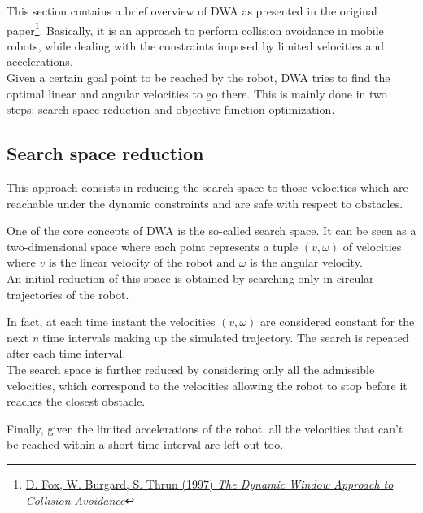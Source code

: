 \documentclass[11pt,a4paper]{article}
\begin{document}
This section contains a brief overview of DWA as presented in the original
paper\footnote{\href{https://www.ri.cmu.edu/pub_files/pub1/fox_dieter_1997_1/fox_dieter_1997_1.pdf}
{D. Fox, W. Burgard, S. Thrun (1997) \textit{The Dynamic Window Approach to Collision Avoidance}}}.
Basically, it is an approach to perform collision avoidance in mobile robots, while dealing with the constraints
imposed by limited velocities and accelerations.\\

Given a certain goal point to be reached by the robot, DWA tries to find the optimal linear and angular velocities
to go there. This is mainly done in two steps: search space reduction and objective function optimization.



\subsection{Search space reduction}

This approach consists in reducing the search space to those velocities which are reachable under the dynamic
constraints and are safe with respect to obstacles.

One of the core concepts of DWA is the so-called search space. It can be seen as a two-dimensional space where
each point represents a tuple $(v, \omega)$ of velocities where $v$ is the linear velocity of the robot and
$\omega$ is the angular velocity.\\

An initial reduction of this space is obtained by searching only in circular trajectories of the robot.

In fact, at each time instant the velocities $(v, \omega)$ are considered constant for the next \textit{n}
time intervals making up the simulated trajectory. The search is repeated after each time interval.\\

The search space is further reduced by considering only all the admissible velocities, which correspond to
the velocities allowing the robot to stop before it reaches the closest obstacle.

Finally, given the limited accelerations of the robot, all the velocities that can't be reached within a short
time interval are left out too.\\
\end{document}
